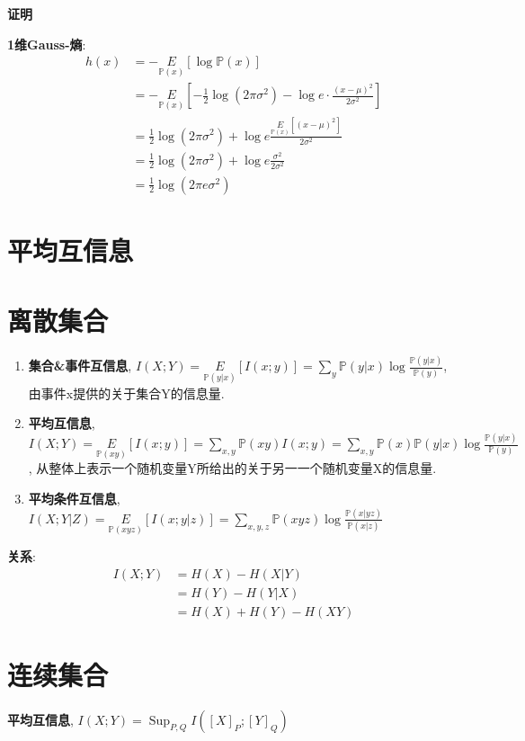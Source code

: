 \documentclass{article}
\newcommand{\env}[2]{\begin{#1}#2\end{#1}}
\newcommand{\defi}[2]{\textbf{#1}, #2}
\newcommand{\proof}[1]{\textbf{证明} #1}
\newcommand{\P}{\mathbb P}
\newcommand{\l}{\left}
\newcommand{\r}{\right}
\begin{document}
                    \proof{\par
                        \textbf{1维Gauss-熵}: 
                        \env{align*}{
                            h(x) 
                            &= -\underset{\P(x)}{E}[\log \P(x)]\\
                            &= -\underset{\P(x)}{E}\l[-\frac{1}{2}\log(2\pi\sigma^2) - \log e · \frac{(x-\mu)^2}{2\sigma ^2}  \r]\\
                            &= \frac{1}{2}\log(2\pi\sigma^2) + \log e \frac{\underset{\P(x)}{E}\l[(x-\mu)^2\r]}{2\sigma ^2}\\
                            &= \frac{1}{2}\log(2\pi\sigma^2) + \log e \frac{\sigma ^2}{2\sigma ^2}\\
                            &= \frac{1}{2}\log(2\pi e\sigma^2)
                        }
                    }

        \section{平均互信息}
            \section{离散集合}
                \env{enumerate}{
                    \item \defi{集合&事件互信息}{$I(X;Y)=\underset{\P(y|x)}{E}[I(x;y)] = \sum\limits_{y} \P(y|x) \log \frac{\P(y|x)}{\P(y)}$, 由事件x提供的关于集合Y的信息量.}
                    \item \defi{平均互信息}{$I(X;Y) = \underset{\P(xy)}{E}[I(x;y)] = \sum\limits_{x,y} \P(xy) I(x;y)=\sum\limits_{x, y} \P(x) \P(y|x) \log \frac{\P(y|x)}{\P(y)}$, 从整体上表示一个随机变量Y所给出的关于另一一个随机变量X的信息量.}
                    \item \defi{平均条件互信息}{$I(X;Y|Z)=\underset{\P(xyz)}{E}[I(x;y|z)]=\sum\limits_{x,y,z} \P(xyz) \log \frac{\P(x|yz)}{\P(x|z)}$}
                }
                
                \textbf{关系}: 
                    \env{align*}{
                        I(X;Y) 
                        &= H(X)-H(X|Y) \\
                        &= H(Y)-H(Y|X) \\
                        &= H(X)+H(Y)-H(X Y)
                    }
             
            \section{连续集合}
                \defi{平均互信息}{$I(X;Y)=\operatorname{Sup}_{P, Q} I\l([X]_{P} ;[Y]_{Q}\r)$}
                
\end{document}
